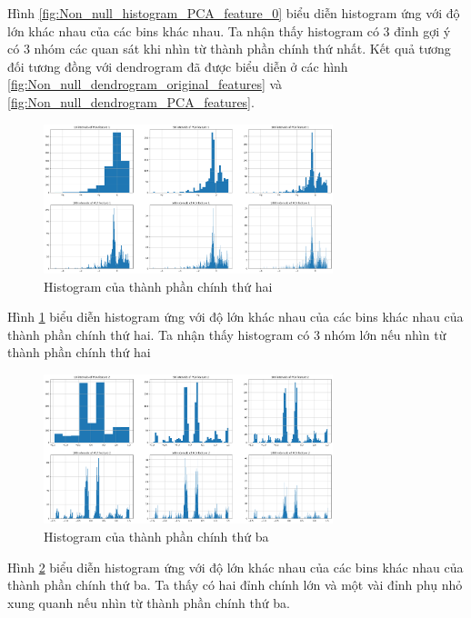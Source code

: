 Hình \ref{fig:Non_null_histogram_PCA_feature_0} biểu diễn histogram ứng với độ lớn khác nhau của các bins khác nhau.
Ta nhận thấy histogram có 3 đỉnh gợi ý có 3 nhóm các quan sát khi nhìn từ thành phần chính thứ nhất.
Kết quả tương đối tương đồng với dendrogram đã được biểu diễn ở các hình \ref{fig:Non_null_dendrogram_original_features} và \ref{fig:Non_null_dendrogram_PCA_features}.

\begin{figure}[H]
    \centering
    \includegraphics[width=0.75\textwidth]{figures/Thanh/Data_Analysis/Non_null_histogram_PCA_feature_1.png}
    \caption{Histogram của thành phần chính thứ hai}
    \label{fig:Non_null_histogram_PCA_feature_1}
\end{figure}

Hình \ref{fig:Non_null_histogram_PCA_feature_1} biểu diễn histogram ứng với độ lớn khác nhau của các bins khác nhau của thành phần chính thứ hai.
Ta nhận thấy histogram có 3 nhóm lớn nếu nhìn từ thành phần chính thứ hai

\begin{figure}[H]
    \centering
    \includegraphics[width=0.75\textwidth]{figures/Thanh/Data_Analysis/Non_null_histogram_PCA_feature_2.png}
    \caption{Histogram của thành phần chính thứ ba}
    \label{fig:Non_null_histogram_PCA_feature_2}
\end{figure}

Hình \ref{fig:Non_null_histogram_PCA_feature_2} biểu diễn histogram ứng với độ lớn khác nhau của các bins khác nhau của thành phần chính thứ ba.
Ta thấy có hai đỉnh chính lớn và một vài đỉnh phụ nhỏ xung quanh nếu nhìn từ thành phần chính thứ ba.

